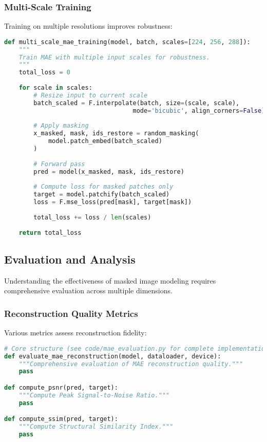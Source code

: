 \subsubsection{Multi-Scale Training}

Training on multiple resolutions improves robustness:

\begin{lstlisting}[language=Python, caption=Multi-scale masked image modeling training]
def multi_scale_mae_training(model, batch, scales=[224, 256, 288]):
    """
    Train MAE with multiple input scales for robustness.
    """
    total_loss = 0
    
    for scale in scales:
        # Resize input to current scale
        batch_scaled = F.interpolate(batch, size=(scale, scale), 
                                   mode='bicubic', align_corners=False)
        
        # Apply masking
        x_masked, mask, ids_restore = random_masking(
            model.patch_embed(batch_scaled)
        )
        
        # Forward pass
        pred = model(x_masked, mask, ids_restore)
        
        # Compute loss for masked patches only
        target = model.patchify(batch_scaled)
        loss = F.mse_loss(pred[mask], target[mask])
        
        total_loss += loss / len(scales)
    
    return total_loss
\end{lstlisting}

\subsection{Evaluation and Analysis}

Understanding the effectiveness of masked image modeling requires comprehensive evaluation across multiple dimensions.

\subsubsection{Reconstruction Quality Metrics}

Various metrics assess reconstruction fidelity:

\begin{lstlisting}[language=Python, caption=Comprehensive evaluation of MAE reconstruction quality]
# Core structure (see code/mae_evaluation.py for complete implementation)
def evaluate_mae_reconstruction(model, dataloader, device):
    """Comprehensive evaluation of MAE reconstruction quality."""
    pass

def compute_psnr(pred, target):
    """Compute Peak Signal-to-Noise Ratio."""
    pass

def compute_ssim(pred, target):
    """Compute Structural Similarity Index."""
    pass
\end{lstlisting}

